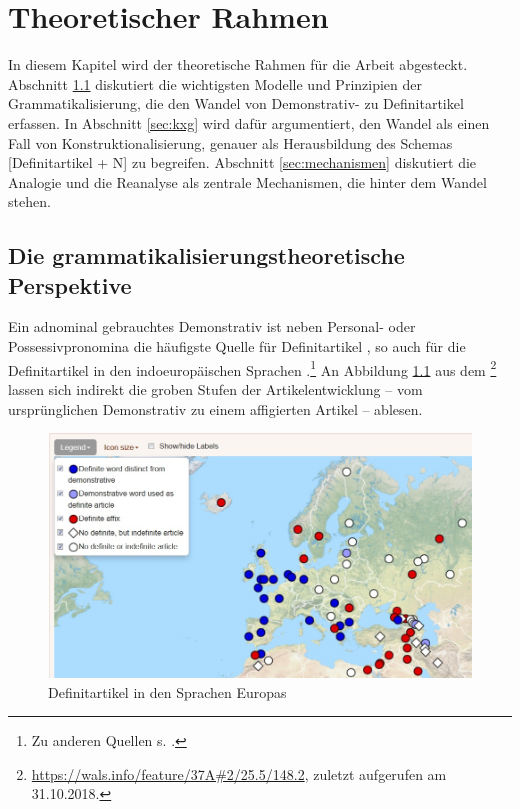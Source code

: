 \chapter{Theoretischer Rahmen} \label{chapter:theorie}

In diesem Kapitel wird der theoretische Rahmen für die Arbeit abgesteckt. 
Abschnitt \ref{sec:gram} diskutiert die wichtigsten Modelle und Prinzipien  der Grammatikalisierung, die den Wandel von Demonstrativ- zu Definitartikel erfassen. In Abschnitt \ref{sec:kxg} wird dafür argumentiert, den Wandel als einen Fall von Konstruktionalisierung, genauer als Herausbildung des Schemas [Definitartikel + N] zu begreifen. Abschnitt \ref{sec:mechanismen} diskutiert die Analogie und die Reanalyse als zentrale Mechanismen, die hinter dem Wandel stehen.  

\section{Die grammatikalisierungstheoretische Perspektive}\label{sec:gram}

Ein adnominal gebrauchtes Demonstrativ ist neben Personal- oder Possessivpronomina die häufigste Quelle für Definitartikel \parencites()(){Himmelmann1997}[215]{Heine2002}, so auch für die Definitartikel in den indoeuropäischen Sprachen \parencite{vonHeusinger2013}.\footnote{Zu anderen Quellen s. \textcites()()[][839]{Himmelmann2001}[523]{deMulder2011}.}
An Abbildung \ref{wals} aus dem \footnote{\url{https://wals.info/feature/37A\#2/25.5/148.2}, zuletzt aufgerufen am 31.10.2018.} lassen sich  indirekt die groben Stufen der Artikelentwicklung -- vom ursprünglichen Demonstrativ zu einem affigierten Artikel -- ablesen. 

\begin{figure}
\begin{center}
  \includegraphics[width=\textwidth]{images/wals.jpg}
\caption {Definitartikel in den Sprachen Europas \parencite{Dryer2013}}
\label{wals}
\end{center}
\end{figure} 


